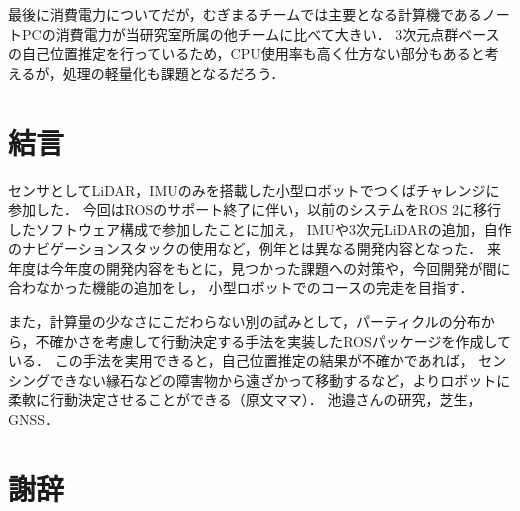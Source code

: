 \documentclass[twocolumn,9pt]{jsproceedings}
\begin{document}
最後に消費電力についてだが，むぎまるチームでは主要となる計算機であるノートPCの消費電力が当研究室所属の他チームに比べて大きい．
3次元点群ベースの自己位置推定を行っているため，CPU使用率も高く仕方ない部分もあると考えるが，処理の軽量化も課題となるだろう．


\section{結言}
センサとしてLiDAR，IMUのみを搭載した小型ロボットでつくばチャレンジに参加した．
今回はROSのサポート終了に伴い，以前のシステムをROS 2に移行したソフトウェア構成で参加したことに加え，
IMUや3次元LiDARの追加，自作のナビゲーションスタックの使用など，例年とは異なる開発内容となった．
来年度は今年度の開発内容をもとに，見つかった課題への対策や，今回開発が間に合わなかった機能の追加をし，
小型ロボットでのコースの完走を目指す．

また，計算量の少なさにこだわらない別の試みとして，パーティクルの分布から，不確かさを考慮して行動決定する手法を実装したROSパッケージを作成している\cite{pfc}．
この手法を実用できると，自己位置推定の結果が不確かであれば，
センシングできない縁石などの障害物から遠ざかって移動するなど，よりロボットに柔軟に行動決定させることができる（原文ママ）．
池邉さんの研究，芝生，GNSS．
\cite{ueda2023JRM}
\cite{ikebeMECH}

\section*{謝辞}
\end{document}
